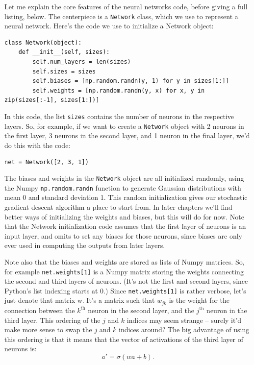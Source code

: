 \documentclass[a4paper,twoside,10pt]{book}
\begin{document}
Let me explain the core features of the neural networks code, before giving a full listing, below. The centerpiece is a \texttt{Network} class, which we use to represent a neural network. Here's the code we use to initialize a Network object:

\begin{lstlisting}
class Network(object):
	def __init__(self, sizes):
		self.num_layers = len(sizes)
		self.sizes = sizes
		self.biases = [np.random.randn(y, 1) for y in sizes[1:]]
		self.weights = [np.random.randn(y, x) for x, y in zip(sizes[:-1], sizes[1:])]
\end{lstlisting}
In this code, the list \texttt{sizes} contains the number of neurons in the respective layers. So, for example, if we want to create a \texttt{Network} object with 2 neurons in the first layer, 3 neurons in the second layer, and 1 neuron in the final layer, we'd do this with the code:

\begin{lstlisting}
net = Network([2, 3, 1])
\end{lstlisting}
The biases and weights in the \texttt{Network} object are all initialized randomly, using the Numpy \texttt{np.random.randn} function to generate Gaussian distributions with mean 0 and standard deviation 1. This random initialization gives our stochastic gradient descent algorithm a place to start from. In later chapters we'll find better ways of initializing the weights and biases, but this will do for now. Note that the Network initialization code assumes that the first layer of neurons is an input layer, and omits to set any biases for those neurons, since biases are only ever used in computing the outputs from later layers.

Note also that the biases and weights are stored as lists of Numpy matrices. So, for example \texttt{net.weights[1]} is a Numpy matrix storing the weights connecting the second and third layers of neurons. (It's not the first and second layers, since Python's list indexing starts at 0.) Since \texttt{net.weights[1]} is rather verbose, let's just denote that matrix w. It's a matrix such that $w_{jk}$ is the weight for the connection between the $k^\mathrm{th}$ neuron in the second layer, and the $j^\mathrm{th}$ neuron in the third layer. This ordering of the $j$ and $k$ indices may seem strange -- surely it'd make more sense to swap the $j$ and $k$ indices around? The big advantage of using this ordering is that it means that the vector of activations of the third layer of neurons is:
\begin{equation}
	a' = \sigma(w a + b).
	\label{eq:22}
\end{equation}
\end{document}
